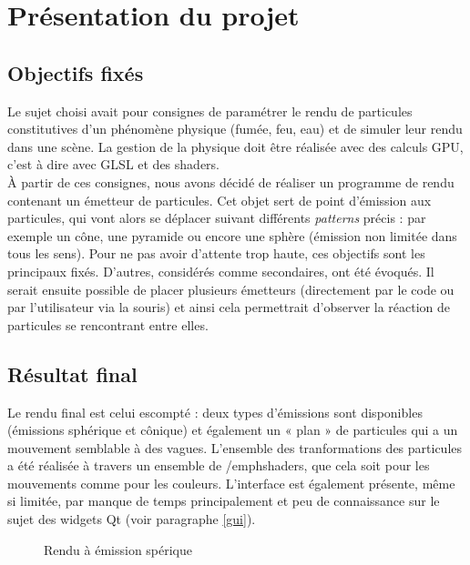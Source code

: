 \chapter{Présentation du projet}

\section{Objectifs fixés}

Le sujet choisi avait pour consignes de paramétrer le rendu de particules
constitutives d'un phénomène physique (fumée, feu, eau) et de simuler leur
rendu dans une scène. La gestion de la physique doit être réalisée avec des
calculs GPU, c'est à dire avec GLSL et des shaders.\\

À partir de ces consignes, nous avons décidé de réaliser un programme de rendu
contenant un émetteur de particules. Cet objet sert de point d'émission aux
particules, qui vont alors se déplacer suivant différents \emph{patterns} précis
: par exemple un cône, une pyramide ou encore une sphère (émission non limitée 
dans tous les sens). Pour ne pas avoir d'attente trop haute, ces objectifs sont
les principaux fixés. D'autres, considérés comme secondaires, ont été évoqués.
Il serait ensuite possible de placer plusieurs émetteurs (directement par le 
code ou par l'utilisateur via la souris) et ainsi cela permettrait d'observer la
réaction de particules se rencontrant entre elles.\\

\section{Résultat final}

Le rendu final est celui escompté : deux types d'émissions sont disponibles
(émissions sphérique et cônique) et également un « plan » de particules qui a un
mouvement semblable à des vagues. L'ensemble des tranformations des particules a
été réalisée à travers un ensemble de /emph{shaders}, que cela soit pour les
mouvements comme pour les couleurs. L'interface est également présente, même si
limitée, par manque de temps principalement et peu de connaissance sur le sujet
des widgets Qt (voir paragraphe \ref{gui}).

\begin{figure}[h]
	\begin{center}
	\end{center}
	\caption{Rendu à émission spérique}
\end{figure}

